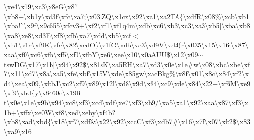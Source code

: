 \begin{DoxyCompactItemize}
\textbackslash{}xe4\textbackslash{}x19\textbackslash{}xc3\textbackslash{}x8e\+G\textbackslash{}x87 \textbackslash{}xb8+\textbackslash{}xb1y\textbackslash{}xd3f\textbackslash{}xfc\textbackslash{}xa7;\textbackslash{}x03.\+Z\+Q\textbackslash{}x1cx\textbackslash{}x92\textbackslash{}xa1\textbackslash{}xa2\+T\+A\{\textbackslash{}xdf\+R\textbackslash{}x08\%\textbackslash{}xcb\textbackslash{}xb1\textbackslash{}xba!\`{}\textbackslash{}x9f\textbackslash{}x9c555\textbackslash{}xfcv3+\textbackslash{}xf2\textbackslash{}xf1\textbackslash{}xf1q4m\textbackslash{}xdb\textbackslash{}xc6\textbackslash{}xb3\textbackslash{}xc3\textbackslash{}xa3\textbackslash{}xb5\mbox{[}\textbackslash{}xba\textbackslash{}xb8\textbackslash{}xa8\textbackslash{}xe8\textbackslash{}xd3\+E\textbackslash{}xf8\textbackslash{}xfb\textbackslash{}xa7\textbackslash{}xdd\textbackslash{}xb5\textbackslash{}xcf$<$\textbackslash{}xb1\textbackslash{}x1c\textbackslash{}xf9\+K\textbackslash{}xfe\textbackslash{}x82\textbackslash{}xed\+O\}\textbackslash{}x1f\+G\textbackslash{}xdb\textbackslash{}xe3\textbackslash{}xd9\+V\textbackslash{}xd4(r\textbackslash{}x035\textbackslash{}x15\textbackslash{}x16\+:\textbackslash{}x87\textbackslash{}xaa\textbackslash{}xf0\textbackslash{}xc6\textbackslash{}xfb\textbackslash{}xf5\textbackslash{}xf0\textbackslash{}xfb\+Y\textbackslash{}xe6\textbackslash{}xee\textbackslash{}x10\textbackslash{}x0a\+A\+U\+U\$\textbackslash{}x12\textbackslash{}x09$\sim$tsw\+D\+G\textbackslash{}x17\textbackslash{}x1b\mbox{[}\textbackslash{}x94\textbackslash{}x92\$\textbackslash{}x81s\+K\textbackslash{}xa5\+R\+H\textbackslash{}xa7\textbackslash{}xd3\textbackslash{}x0e\textbackslash{}x1e\#w\textbackslash{}x08\textbackslash{}xbc\textbackslash{}xbe\textbackslash{}xf7\textbackslash{}x11\textbackslash{}xd7\textbackslash{}x8a\textbackslash{}xa5\textbackslash{}xfe\textbackslash{}xbf\textbackslash{}x15\+V\textbackslash{}xde\textbackslash{}x85gw\textbackslash{}xac\+Bkg\%\textbackslash{}x8f\textbackslash{}x01\textbackslash{}x8c\textbackslash{}x84\textbackslash{}xf2\textbackslash{}xd4\textbackslash{}xea\textbackslash{}x09,\textbackslash{}xbb\+J\textbackslash{}xc2\textbackslash{}xf9\textbackslash{}x89\textbackslash{}x12l\textbackslash{}xd8\textbackslash{}x9d\textbackslash{}x84\textbackslash{}xc9\textbackslash{}xde\textbackslash{}x84\textbackslash{}x22+\textbackslash{}xf6\+M\textbackslash{}xe9\textbackslash{}xf9\textbackslash{}xbd\{y\textbackslash{}x8460c\textbackslash{}x19\+R$\vert$t\textbackslash{}x0e\textbackslash{}x1e\textbackslash{}x9b\textbackslash{}x94\textbackslash{}xc8\textbackslash{}xf3\textbackslash{}xcd\textbackslash{}xdf\textbackslash{}xe7\textbackslash{}xf3\textbackslash{}xb9/\textbackslash{}xa5\textbackslash{}xa1\textbackslash{}x92\textbackslash{}xaa\textbackslash{}x87\textquotesingle{}\textbackslash{}xf3\textbackslash{}x1b+\textbackslash{}xffx\textbackslash{}xe0\+W\textbackslash{}xf8\textbackslash{}xed\textbackslash{}xeby\textbackslash{}xf4b?\textbackslash{}xb8\textbackslash{}xad\textbackslash{}xbd\{\textbackslash{}x18\textbackslash{}xf7\textbackslash{}xdf\&\textbackslash{}x22\textbackslash{}x92\textbackslash{}xcc\+C\textbackslash{}xf3\textbackslash{}xdb7\#\textbackslash{}x16\textbackslash{}x7f\textbackslash{}x07\textbackslash{}xb2\$\textbackslash{}x83\textbackslash{}xa9\textbackslash{}x16\textb
\end{DoxyCompactItemize}
